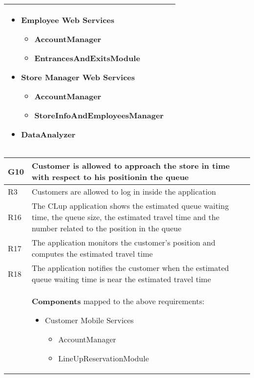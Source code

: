 \begin{center}
{\begin{longtable}{L{2.5cm}L{12cm}}
        \medskip
        \begin{itemize}
            \item Employee Web Services \begin{itemize}
                \item AccountManager
                \item EntrancesAndExitsModule
            \end{itemize}
            \item Store Manager Web Services \begin{itemize}
                \item AccountManager
                \item StoreInfoAndEmployeesManager
            \end{itemize}
            \item DataAnalyzer
        \end{itemize} \\
        \hline
    \end{longtable}}

    {\renewcommand{\arraystretch}{1.5}
    \begin{longtable}{L{2.5cm}L{12cm}}
        \hline
        \textbf{G10} & \textbf{Customer is allowed to approach the store in time with respect to his positionin the queue} \\
        \hline
         R3 & Customers are allowed to log in inside the application \\
        \hline
         R16 & The CLup application shows the estimated queue waiting time, the queue size, the estimated travel time and the number related to the position in the queue \\
        \hline
         R17 & The application monitors the customer’s position and computes the estimated travel time \\
        \hline
         R18 & The application notifies the customer when the estimated queue waiting time is near the estimated travel time \\
        \hline
         & \textbf{Components} mapped to the above requirements:

        \medskip
        \begin{itemize}
            \item Customer Mobile Services \begin{itemize}
                \item AccountManager
                \item LineUpReservationModule
            \end{itemize}
        \end{itemize} \\
        \hline
    \end{longtable}}
\end{center}